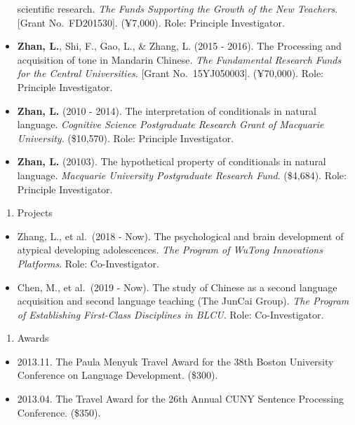 \documentclass[
  12pt,
]{article}
\providecommand{\tightlist}{%
  \setlength{\itemsep}{0pt}\setlength{\parskip}{0pt}}
\begin{document}
\begin{itemize}
  scientific research. \emph{The Funds Supporting the Growth of the New
  Teachers}. {[}Grant No.~FD201530{]}. (¥7,000). Role: Principle
  Investigator.
\item
  \textbf{Zhan, L.}, Shi, F., Gao, L., \& Zhang, L. (2015 - 2016). The
  Processing and acquisition of tone in Mandarin Chinese. \emph{The
  Fundamental Research Funds for the Central Universities}. {[}Grant
  No.~15YJ050003{]}. (¥70,000). Role: Principle Investigator.
\item
  \textbf{Zhan, L.} (2010 - 2014). The interpretation of conditionals in
  natural language. \emph{Cognitive Science Postgraduate Research Grant
  of Macquarie University}. (\$10,570). Role: Principle Investigator.
\item
  \textbf{Zhan, L.} (20103). The hypothetical property of conditionals
  in natural language. \emph{Macquarie University Postgraduate Research
  Fund}. (\$4,684). Role: Principle Investigator.
\end{itemize}

\begin{enumerate}
\def\labelenumi{\arabic{enumi}.}
\setcounter{enumi}{1}
\tightlist
\item
  Projects
\end{enumerate}

\begin{itemize}
\item
  Zhang, L., et al.~(2018 - Now). The psychological and brain
  development of atypical developing adolescences. \emph{The Program of
  WuTong Innovations Platforms}. Role: Co-Investigator.
\item
  Chen, M., et al.~(2019 - Now). The study of Chinese as a second
  language acquisition and second language teaching (The JunCai Group).
  \emph{The Program of Establishing First-Class Disciplines in BLCU}.
  Role: Co-Investigator.
\end{itemize}

\begin{enumerate}
\def\labelenumi{\arabic{enumi}.}
\setcounter{enumi}{2}
\tightlist
\item
  Awards
\end{enumerate}

\begin{itemize}
\item
  2013.11. The Paula Menyuk Travel Award for the 38th Boston University
  Conference on Language Development. (\$300).
\item
  2013.04. The Travel Award for the 26th Annual CUNY Sentence Processing
  Conference. (\$350).
\end{itemize}
\end{document}
